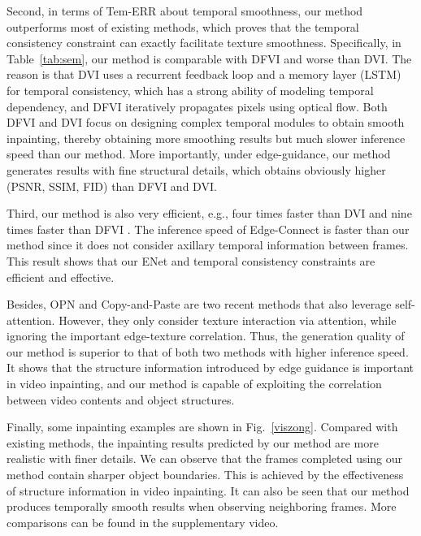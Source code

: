 {\color{blue}
Second, in terms of Tem-ERR about temporal smoothness, our method outperforms most of existing methods, which proves that the temporal consistency constraint can exactly facilitate texture smoothness.
Specifically, in Table~\ref{tab:sem}, our method is comparable with DFVI and worse than DVI.
The reason is that DVI uses a recurrent feedback loop and a memory layer (LSTM) for temporal consistency, which has a strong ability of modeling temporal dependency, and DFVI iteratively propagates pixels using optical flow. Both DFVI and DVI focus on designing complex temporal modules to obtain smooth inpainting, thereby obtaining more smoothing results but much slower inference speed than our method. More importantly, under edge-guidance, our method generates results with fine structural details, which obtains obviously higher (PSNR, SSIM, FID) than DFVI and DVI.
}

Third, our method is also very efficient, e.g., four times faster than DVI \cite{Kim_2019_CVPR1} and nine times faster than DFVI \cite{Xu_2019_CVPR}. 
The inference speed of Edge-Connect is faster than our method since it does not consider axillary temporal information between frames. 
This result shows that our ENet and temporal consistency constraints are efficient and effective. 



{\color{blue} Besides, OPN \cite{oh2019onion} and Copy-and-Paste \cite{lee2019copy} are two recent methods that also leverage self-attention.
However, they only consider texture interaction via attention, while ignoring the important edge-texture correlation.
Thus, the generation quality of our method is superior to that of both two methods with higher inference speed. It shows that the structure information introduced by edge guidance is important in video inpainting, and our method is capable of exploiting the correlation between video contents and object structures. }
%

Finally, some inpainting examples are shown in Fig.~\ref{viszong}.
Compared with existing methods, the inpainting results predicted by our method are more realistic with finer details. 
We can observe that the frames completed using our method contain sharper object boundaries. This is achieved by the effectiveness of structure information in video inpainting.
%
It can also be seen that our method produces temporally smooth results when observing neighboring frames. More comparisons can be found in the supplementary video. 

